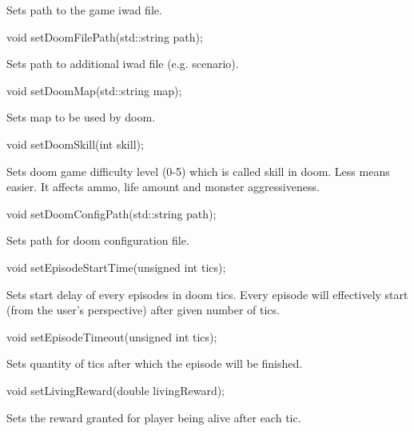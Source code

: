 Sets path to the game iwad file.


\vspace{20pt}
\begin{clinee}
void setDoomFilePath(std::string path);
\end{clinee}

Sets path to additional iwad file (e.g. scenario).


\vspace{20pt}
\begin{clinee}
void setDoomMap(std::string map);
\end{clinee}

Sets map to be used by doom.


\vspace{20pt}
\begin{clinee}      
void setDoomSkill(int skill);
\end{clinee}

Sets doom game difficulty level (0-5) which is called skill in doom. Less means easier. It affects ammo, life amount and monster aggressiveness. %


\vspace{20pt}
\begin{clinee}
void setDoomConfigPath(std::string path);
\end{clinee}

Sets path for doom configuration file.


\vspace{20pt}
\begin{clinee}    
void setEpisodeStartTime(unsigned int tics);
\end{clinee}

Sets start delay of every episodes in doom tics. Every episode will effectively start (from the user's perspective) after given number of tics.


\vspace{20pt}
\begin{clinee}
void setEpisodeTimeout(unsigned int tics);
\end{clinee}

Sets quantity of tics after which the episode will be finished.


\vspace{20pt}
\begin{clinee}
void setLivingReward(double livingReward);
\end{clinee}

Sets the reward granted for player being alive after each tic.


